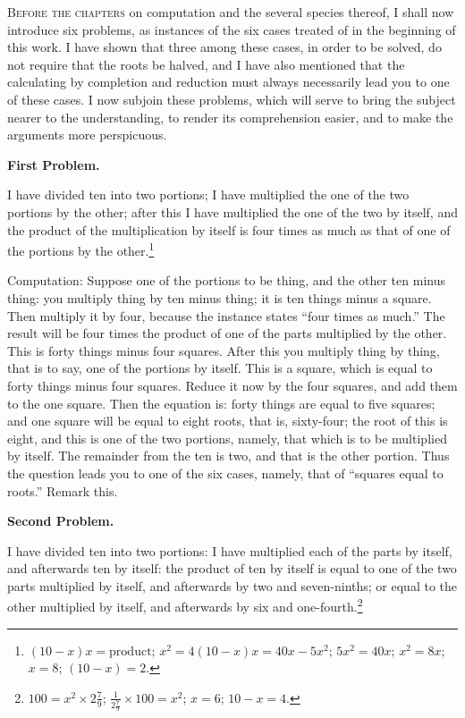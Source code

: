 \lettrine{B}{efore the chapters} on computation and the several species thereof, I shall now introduce six problems, as instances of the six cases treated of in the beginning of this work. I have shown that three among these cases, in order to be solved, do not require that the roots be halved, and I have also mentioned that the calculating by completion and reduction must always necessarily lead you to one of these cases. I now subjoin these problems, which will serve to bring the subject nearer to the understanding, to render its comprehension easier, and to make the arguments more perspicuous.

\vspace{0.3cm}
\noindent\textbf{First Problem.}

I have divided ten into two portions; I have multiplied the one of the two portions by the other; after this I have multiplied the one of the two by itself, and the product of the multiplication by itself is four times as much as that of one of the portions by the other.\footnote{$(10-x)x = \text{product}$; $x^2 = 4(10-x)x = 40x - 5x^2$; $5x^2 = 40x$; $x^2 = 8x$; $x = 8$; $(10-x) = 2$.}

Computation: Suppose one of the portions to be thing, and the other ten minus thing: you multiply thing by ten minus thing; it is ten things minus a square. Then multiply it by four, because the instance states ``four times as much.'' The result will be four times the product of one of the parts multiplied by the other. This is forty things minus four squares. After this you multiply thing by thing, that is to say, one of the portions by itself. This is a square, which is equal to forty things minus four squares. Reduce it now by the four squares, and add them to the one square. Then the equation is: forty things are equal to five squares; and one square will be equal to eight roots, that is, sixty-four; the root of this is eight, and this is one of the two portions, namely, that which is to be multiplied by itself. The remainder from the ten is two, and that is the other portion. Thus the question leads you to one of the six cases, namely, that of ``squares equal to roots.'' Remark this.

\vspace{0.3cm}
\noindent\textbf{Second Problem.}

I have divided ten into two portions: I have multiplied each of the parts by itself, and afterwards ten by itself: the product of ten by itself is equal to one of the two parts multiplied by itself, and afterwards by two and seven-ninths; or equal to the other multiplied by itself, and afterwards by six and one-fourth.\footnote{$100 = x^2 \times 2\frac{7}{9}$; $\frac{1}{2\frac{7}{9}} \times 100 = x^2$; $x = 6$; $10 - x = 4$.}

